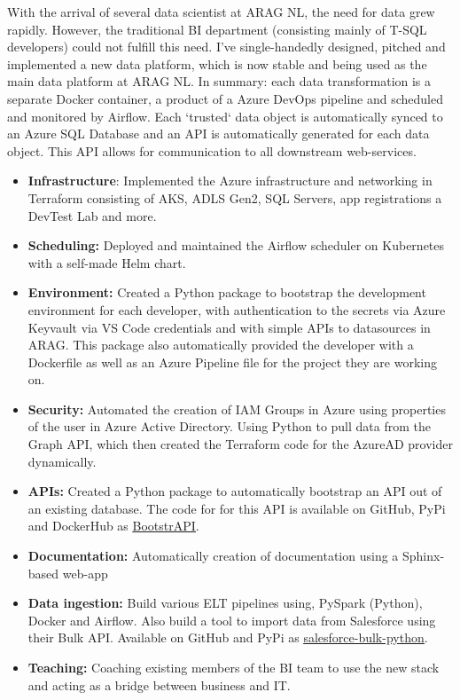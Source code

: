 \documentclass[A4,11pt]{article}
\newcommand{\CVItem}[1]{
  \item\small{
    {#1 \vspace{-2pt}}
  }
}
\newcommand{\CVItemListStart}{\begin{itemize}}
\newcommand{\CVItemListEnd}{\end{itemize}\vspace{-5pt}}
\begin{document}
      With the arrival of several data scientist at ARAG NL, the need for data grew rapidly. However, the traditional BI department (consisting mainly of T-SQL developers) could not fulfill this need. I've single-handedly designed, pitched and implemented a new data platform, which is now stable and being used as the main data platform at ARAG NL. In summary: each data transformation is a separate Docker container, a product of a Azure DevOps pipeline and scheduled and monitored by Airflow. Each `trusted` data object is automatically synced to an Azure SQL Database and an API is automatically generated for each data object. This API allows for communication to all downstream web-services.
      \vspace{-5pt}
      \CVItemListStart
        \CVItem{\textbf{Infrastructure}: Implemented the Azure infrastructure and networking in Terraform consisting of AKS, ADLS Gen2, SQL Servers, app registrations a DevTest Lab and more.}
        \CVItem{\textbf{Scheduling:} Deployed and maintained the Airflow scheduler on Kubernetes with a self-made Helm chart.}
        \CVItem{\textbf{Environment:} Created a Python package to bootstrap the development environment for each developer, with authentication to the secrets via Azure Keyvault via VS Code credentials and with simple APIs to datasources in ARAG. This package also automatically provided the developer with a Dockerfile as well as an Azure Pipeline file for the project they are working on.}
        \CVItem{\textbf{Security: }Automated the creation of IAM Groups in Azure using properties of the user in Azure Active Directory. Using Python to pull data from the Graph API, which then created the Terraform code for the AzureAD provider dynamically.}
        \CVItem{\textbf{APIs:} Created a Python package to automatically bootstrap an API out of an existing database. The code for for this API is available on GitHub, PyPi and DockerHub as \href{https://github.com/mrpowerus/bootstrapi}{\underline{BootstrAPI}}.}
        \CVItem{\textbf{Documentation: } Automatically creation of documentation using a Sphinx-based web-app}
        \CVItem{\textbf{Data ingestion: } Build various ELT pipelines using, PySpark (Python), Docker and Airflow. Also build a tool to import data from Salesforce using their Bulk API. Available on GitHub and PyPi as \href{https://github.com/mrpowerus/salesforce-bulk-python}{\underline{salesforce-bulk-python}}.}
        \CVItem{\textbf{Teaching: } Coaching existing members of the BI team to use the new stack and acting as a bridge between business and IT.}
      \CVItemListEnd
      
\end{document}
